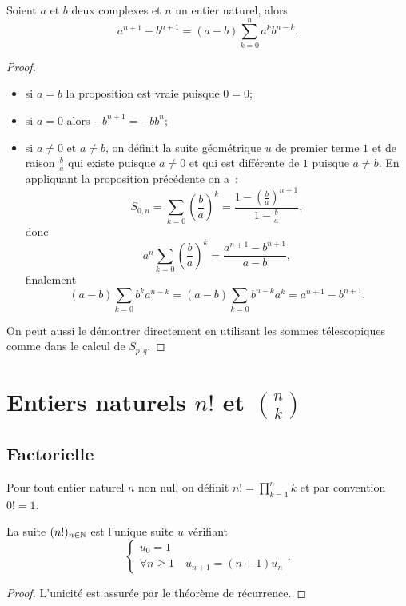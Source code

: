\begin{prop}
  Soient $a$ et $b$ deux complexes et $n$ un entier naturel, alors
  \begin{equation}
    a^{n+1}-b^{n+1}=(a-b)\sum_{k=0}^n a^k b^{n-k}.
  \end{equation}
\end{prop}
\begin{proof}
  \begin{itemize}
  \item si $a=b$ la proposition est vraie puisque $0=0$;
  \item si $a=0$ alors $-b^{n+1}=-b b^n$;
  \item si $a\neq 0$ et $a\neq b$, on définit la suite géométrique $u$ de premier terme $1$ et de raison $\frac{b}{a}$ qui existe puisque $a\neq 0$ et qui est différente de $1$ puisque $a\neq b$. En appliquant la proposition précédente on a~: 
\begin{equation}
  S_{0,n}=\sum_{k=0}\left(\frac{b}{a}\right)^k=\frac{1-\left(\frac{b}{a}\right)^{n+1}}{1-\frac{b}{a}},
\end{equation}
donc
\begin{equation}
  a^n \sum_{k=0}\left(\frac{b}{a}\right)^k = \frac{a^{n+1}-b^{n+1}}{a-b},
\end{equation}
finalement
\begin{equation}
  (a-b)\sum_{k=0}b^ka^{n-k}=(a-b)\sum_{k=0}b^{n-k}a^{k}=a^{n+1}-b^{n+1}.
\end{equation}
\end{itemize}
On peut aussi le démontrer directement en utilisant les sommes télescopiques comme dans le calcul de $S_{p,q}$.
\end{proof}

\section{Entiers naturels $n!$ et $\binom{n}{k}$}

\subsection{Factorielle}

\begin{defdef}
  Pour tout entier naturel $n$ non nul, on définit $n!=\prod_{k=1}^n k$ et par convention $0!=1$.
\end{defdef}
\begin{prop}
  La suite $(n!)_{n\in\mathbb{N}}$ est l'unique suite $u$ vérifiant
  \begin{equation}
    \begin{cases}
      u_0=1 \\
      \forall n\geq 1 \quad u_{n+1}=(n+1) u_n
    \end{cases}.
  \end{equation}
\end{prop}
\begin{proof}
  L'unicité est assurée par le théorème de récurrence.
\end{proof}

